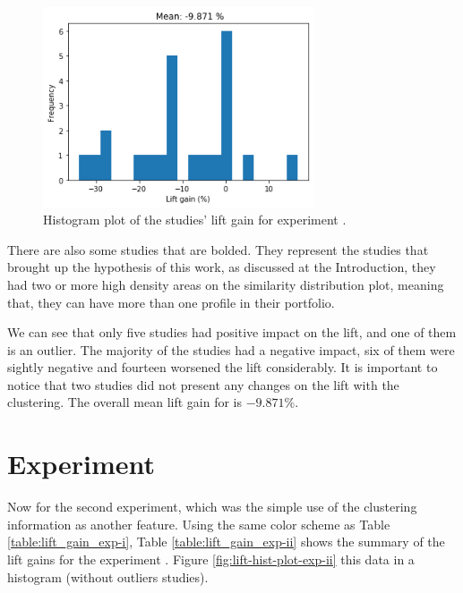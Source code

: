 \begin{figure}[!ht]
   \centering
   \includegraphics[width=8cm]{fig/ch4-lift-hist-plot-exp-i.png}
   \caption{Histogram plot of the studies' lift gain for experiment \nameExperimentI{}.}
   \label{fig:lift-hist-plot-exp-i}
\end{figure}

There are also some studies that are bolded. They represent the studies that brought up the hypothesis of this work, as discussed at the Introduction, they had two or more high density areas on the similarity distribution plot, meaning that, they can have more than one profile in their portfolio.

We can see that only five studies had positive impact on the lift, and one of them is an outlier. The majority of the studies had a negative impact, six of them were sightly negative and fourteen worsened the lift considerably. It is important to notice that two studies did not present any changes on the lift with the clustering. The overall mean lift gain for \nameExperimentI{} is $-9.871 \%$.


\section{Experiment \fullNameExperimentII{}}

Now for the second experiment, which was the simple use of the clustering information as another feature. Using the same color scheme as Table \ref{table:lift_gain_exp-i}, Table \ref{table:lift_gain_exp-ii} shows the summary of the lift gains for the experiment \nameExperimentII{}. Figure \ref{fig:lift-hist-plot-exp-ii} this data in a histogram (without outliers studies).

